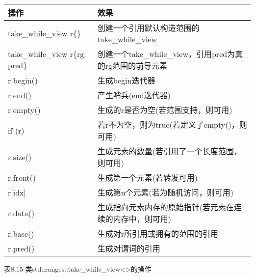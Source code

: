 \begin{longtable}[c]{|l|l|}
\hline
\textbf{操作} & \textbf{效果}                                                        \\ \hline
\endfirsthead
%
\endhead
%
take\_while\_view r\{\}         & 创建一个引用默认构造范围的take\_while\_view                             \\ \hline
take\_while\_view r\{rg. pred\} & 创建一个take\_while\_view，引用pred为真的rg范围的前导元素 \\ \hline
r.begin()          & 生成begin迭代器                                              \\ \hline
r.end()            & 产生哨兵(end迭代器)                                      \\ \hline
r.empty()          & 生成的r是否为空(若范围支持，则可用)         \\ \hline
if (r)             & 若r不为空，则为true(若定义了empty()，则可用)                \\ \hline
r.size()           & 生成元素的数量(若引用了一个长度范围，则可用) \\ \hline
r.front()          & 生成第一个元素(若转发可用)                     \\ \hline
r{[}idx{]}         & 生成第n个元素(若为随机访问，则可用)                    \\ \hline
r.data()           & 生成指向元素内存的原始指针(若元素在连续的内存中，则可用)  \\ \hline
r.base()           & 生成对r所引用或拥有的范围的引用               \\ \hline
r.pred()           & 生成对谓词的引用                                    \\ \hline
\end{longtable}

\begin{center}
表8.15 类std::ranges::take\_while\_view<>的操作
\end{center}


